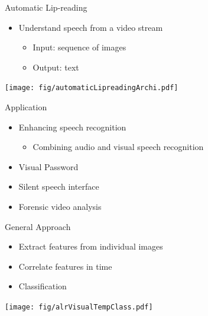 \documentclass{beamer}
\begin{document}
\begin{frame}{Automatic Lip-reading}
    \begin{itemize}
        \item Understand speech from a video stream
        \begin{itemize}
            \item Input: sequence of images
            \item Output: text 
        \end{itemize}
    \end{itemize}
    \begin{center}
    \texttt{[image: fig/automaticLipreadingArchi.pdf]}   
    \end{center}
\end{frame}

\begin{frame}{Application}
    \begin{itemize}
        \item Enhancing speech recognition
        \begin{itemize}
            \item Combining audio and visual speech recognition 
        \end{itemize}
        \item Visual Password 
        \item Silent speech interface
        \item Forensic video analysis 
    \end{itemize}
\end{frame}

\begin{frame}{General Approach}
    \begin{itemize}
        \item Extract features from individual images
        \item Correlate features in time
        \item Classification 
    \end{itemize}
    \begin{center}
    \texttt{[image: fig/alrVisualTempClass.pdf]}   
    \end{center}
\end{frame}
\end{document}
